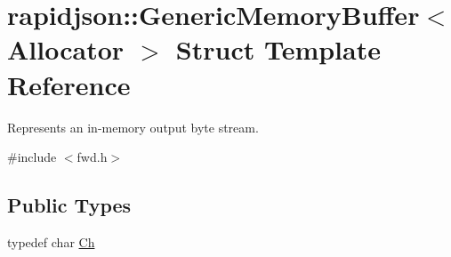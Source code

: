 \hypertarget{structrapidjson_1_1_generic_memory_buffer}{}\section{rapidjson\+::Generic\+Memory\+Buffer$<$ Allocator $>$ Struct Template Reference}
\label{structrapidjson_1_1_generic_memory_buffer}


Represents an in-\/memory output byte stream.  




{\ttfamily \#include $<$fwd.\+h$>$}

\subsection*{Public Types}
\begin{DoxyCompactItemize}
\item 
typedef char \mbox{\hyperlink{structrapidjson_1_1_generic_memory_buffer_a7c2ccd0d38df6d3cb3abd5aed9e100f8}{Ch}}
\end{DoxyCompactItemize}
